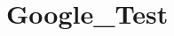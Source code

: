 \chapter{Google\+\_\+\+Test}
\hypertarget{md__r_e_a_d_m_e}{}\label{md__r_e_a_d_m_e}
\label{md__r_e_a_d_m_e_autotoc_md0}%
%
